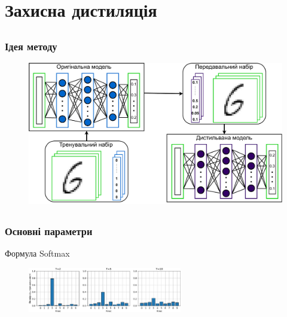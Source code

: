 \documentclass{beamer}
\numberwithin{equation}{section}
\begin{document}
	
	\section{Захисна дистиляція}
	\subsection{}
	\begin{frame}
		\frametitle{Ідея методу}
	
		\begin{figure}[h]
			\centering
			\includegraphics[width=1\textwidth]{../images/diagrams-Distillation.pdf}
			
		\end{figure}
	\end{frame}

	\subsection{}
	\begin{frame}
		\frametitle{Основні параметри}
		
		Формула Softmax
		
		\begin{figure}[h]
			\centering
			\includegraphics[width=0.6\textwidth]{../images/TvsP.pdf}
			
		\end{figure}
	\end{frame}
\end{document}
